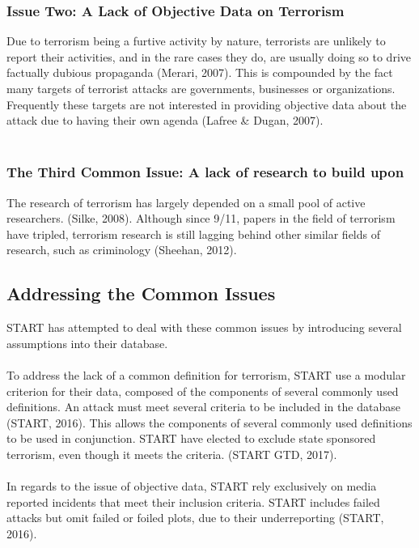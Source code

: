 \documentclass[10pt,a4paper]{article}
\begin{document}
			\subsubsection{Issue Two: A Lack of Objective Data on Terrorism}

Due to terrorism being a furtive activity by nature, terrorists are unlikely to report their activities, and in the rare cases they do, are usually doing so to drive factually dubious propaganda (Merari, 2007).  This is compounded by the fact many targets of terrorist attacks are governments, businesses or organizations. Frequently these targets are not interested in providing objective data about the attack due to having their own agenda (Lafree \& Dugan, 2007). \\\\


			\subsubsection{The Third Common Issue: A lack of research to build upon}
The research of terrorism has largely depended on a small pool of active researchers. (Silke, 2008). Although since 9/11, papers in the field of terrorism have tripled, terrorism research is still lagging behind other similar fields of research, such as criminology (Sheehan, 2012).

		\subsection{Addressing the Common Issues}
START has attempted to deal with these common issues by introducing several assumptions into their database.\\\\

To address the lack of a common definition for terrorism, START use a modular criterion for their data, composed of the components of several commonly used definitions. An attack must meet several criteria to be included in the database (START, 2016). This allows the components of several commonly used definitions to be used in conjunction.  START have elected to exclude state sponsored terrorism, even though it meets the criteria. (START GTD, 2017).\\\\

In regards to the issue of objective data, START rely exclusively on media reported incidents that meet their inclusion criteria. START includes failed attacks but omit failed or foiled plots, due to their underreporting (START, 2016).  \\\\
\end{document}
